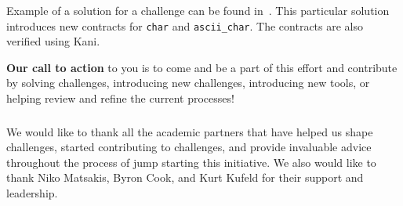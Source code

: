 \documentclass[runningheads]{llncs}
\begin{document}
Example of a solution for a challenge can be found in~\cite{solution}. This particular solution introduces new contracts for \texttt{char} and \texttt{ascii\_char}. The contracts are also verified using Kani. 

\noindent \textbf{Our call to action} to you is to come and be a part of this effort and contribute by solving challenges, introducing new challenges, introducing new tools, or helping review and refine the current processes!

\begin{credits}
\subsubsection{\ackname} We would like to thank all the academic partners that have helped us shape challenges, started contributing to challenges, and provide invaluable advice throughout the process of jump starting this initiative. We also would like to thank Niko Matsakis, Byron Cook, and Kurt Kufeld for their support and leadership.
\end{credits}

%
%


\end{document}
